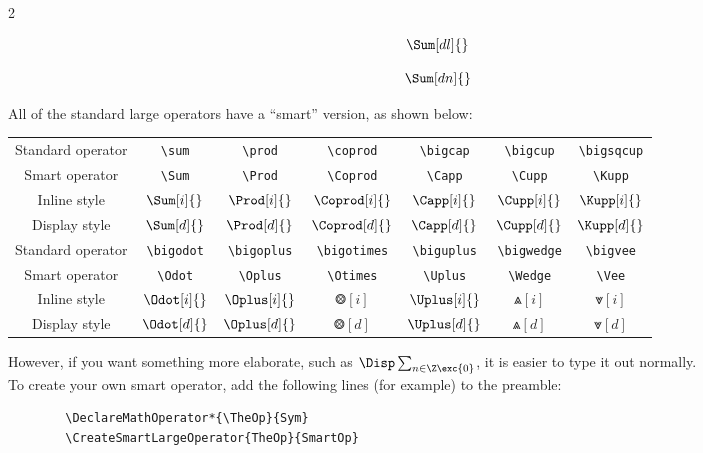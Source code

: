 \documentclass{article}
\begin{document}
{\begin{multicols}{2}
\begin{verbbox}
$$\Sum[dl]{}$$
\end{verbbox}

\begin{verbbox}
$$\Sum[dn]{}$$
\end{verbbox}
\end{multicols}

All of the standard large operators have a ``smart'' version, as shown below:

\begin{center}
\renewcommand*{\arraystretch}{1.5} %
\begin{tabular}{ccccccc}
    Standard operator & \verb!\sum! & \verb!\prod! & \verb!\coprod! & \verb!\bigcap! & \verb!\bigcup! & \verb!\bigsqcup! \\
    Smart operator & \verb!\Sum! & \verb!\Prod! & \verb!\Coprod! & \verb!\Capp! & \verb!\Cupp! & \verb!\Kupp! \\
    Inline style & $\Sum[i]{}$ & $\Prod[i]{}$ & $\Coprod[i]{}$ & $\Capp[i]{}$ & $\Cupp[i]{}$ & $\Kupp[i]{}$ \\
    Display style & $\Sum[d]{}$ & $\Prod[d]{}$ & $\Coprod[d]{}$ & $\Capp[d]{}$ & $\Cupp[d]{}$ & $\Kupp[d]{}$ \\[12pt] %
    Standard operator & \verb!\bigodot! & \verb!\bigoplus! & \verb!\bigotimes! & \verb!\biguplus! & \verb!\bigwedge! & \verb!\bigvee! \\
    Smart operator & \verb!\Odot! & \verb!\Oplus! & \verb!\Otimes! & \verb!\Uplus! & \verb!\Wedge! & \verb!\Vee! \\
    Inline style & $\Odot[i]{}$ & $\Oplus[i]{}$ & $\Otimes[i]{}$ & $\Uplus[i]{}$ & $\Wedge[i]{}$ & $\Vee[i]{}$ \\
    Display style & $\Odot[d]{}$ & $\Oplus[d]{}$ & $\Otimes[d]{}$ & $\Uplus[d]{}$ & $\Wedge[d]{}$ & $\Vee[d]{}$
\end{tabular}
\end{center}

However, if you want something more elaborate, such as $\Disp\sum_{n\in\Z\exc\{0\}}$, it is easier to type it out normally.\\

To create your own smart operator, add the following lines (for example) to the preamble:

\begin{verbatim}
        \DeclareMathOperator*{\TheOp}{Sym}
        \CreateSmartLargeOperator{TheOp}{SmartOp}
\end{verbatim}

}
\end{document}
